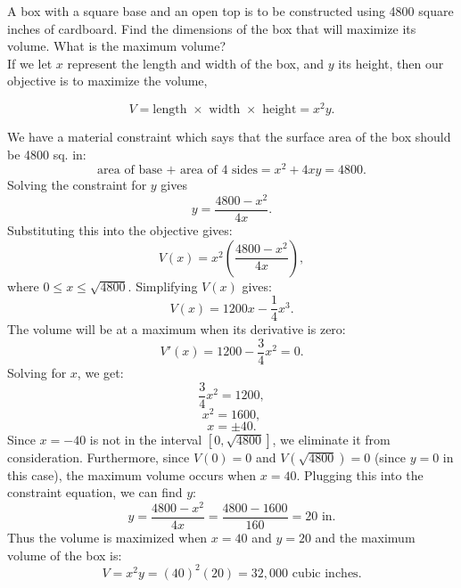 \documentclass{ximera}
\begin{document}
\begin{example}[example 2]
A box with a square base and an open top is to be constructed using 4800 square inches of cardboard.  
Find the dimensions of the box that will maximize its volume.  What is the maximum volume?\\

If we let $x$ represent the length and width of the box, and $y$ its height, then our objective is to maximize 
the volume,


\begin{image}
\end{image}

\[V = \text{length $\times$ width $\times$ height} = x^2y.\]

We have a material constraint which says that the surface area of the box should be 4800 sq. in:
\[\text{area of base + area of 4 sides} = x^2 + 4xy = 4800.\]
Solving the constraint for $y$ gives
\[y = \frac{4800 - x^2}{4x}.\]
Substituting this into the objective gives:
\[V(x) = x^2 \left(\frac{4800 - x^2}{4x}\right),\]
where $0\leq x \leq \sqrt{4800}$.
Simplifying $V(x)$ gives:
\[V(x) = 1200x - \frac14 x^3.\]
The volume will be at a maximum when its derivative is zero:
\[V'(x) = 1200 - \frac34 x^2 = 0.\]
Solving for $x$, we get:
\[ \frac34 x^2 = 1200, \]
\[x^2 = 1600,\]
\[x = \pm 40.\]
Since $x=-40$ is not in the interval $[0, \sqrt{4800}]$, we eliminate it from consideration. 
Furthermore, since $V(0) = 0$ and $V(\sqrt{4800})= 0$ (since $y=0$ in this case), the maximum volume occurs when $x = 40$.
Plugging this into the constraint equation, we can find $y$:
\[y = \frac{4800 - x^2}{4x} = \frac{4800 - 1600}{160} = 20 \mbox{ in.}\]
Thus the volume is maximized when $x = 40$ and $y = 20$ and the maximum volume of the box is:
\[V = x^2y = (40)^2 (20) = 32{,}000 \mbox{ cubic inches}.\]

\end{example}


\begin{center}
\begin{foldable}
\end{foldable}
\end{center}
\end{document}
